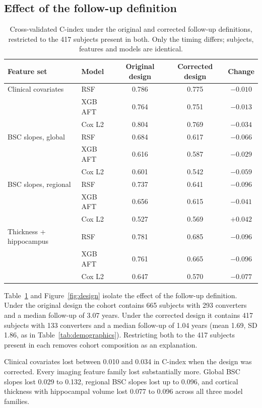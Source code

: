 \documentclass[blue]{ludusofficial}  %
\begin{document}
\subsection{Effect of the follow-up definition}

\begin{table}[t!]
\centering
\caption{Cross-validated C-index under the original and corrected follow-up definitions, restricted to the 417 subjects present in both. Only the timing differs; subjects, features and models are identical.}
\label{tab:design}
\begin{tabular}{llccc}
\hline
\textbf{Feature set} & \textbf{Model} & \textbf{Original design} & \textbf{Corrected design} & \textbf{Change} \\
\hline
Clinical covariates & RSF & 0.786 & 0.775 & $-0.010$ \\
 & XGB AFT & 0.764 & 0.751 & $-0.013$ \\
 & Cox L2 & 0.804 & 0.769 & $-0.034$ \\
\hline
BSC slopes, global & RSF & 0.684 & 0.617 & $-0.066$ \\
 & XGB AFT & 0.616 & 0.587 & $-0.029$ \\
 & Cox L2 & 0.601 & 0.542 & $-0.059$ \\
\hline
BSC slopes, regional & RSF & 0.737 & 0.641 & $-0.096$ \\
 & XGB AFT & 0.656 & 0.615 & $-0.041$ \\
 & Cox L2 & 0.527 & 0.569 & $+0.042$ \\
\hline
Thickness + hippocampus & RSF & 0.781 & 0.685 & $-0.096$ \\
 & XGB AFT & 0.761 & 0.665 & $-0.096$ \\
 & Cox L2 & 0.647 & 0.570 & $-0.077$ \\
\hline
\end{tabular}
\end{table}

Table~\ref{tab:design} and Figure~\ref{fig:design} isolate the effect of the follow-up definition. Under the original design the cohort contains 665 subjects with 293 converters and a median follow-up of 3.07 years. Under the corrected design it contains 417 subjects with 133 converters and a median follow-up of 1.04 years (mean 1.69, SD 1.86, as in Table~\ref{tab:demographics}). Restricting both to the 417 subjects present in each removes cohort composition as an explanation.

Clinical covariates lost between 0.010 and 0.034 in C-index when the design was corrected. Every imaging feature family lost substantially more. Global BSC slopes lost 0.029 to 0.132, regional BSC slopes lost up to 0.096, and cortical thickness with hippocampal volume lost 0.077 to 0.096 across all three model families.
\end{document}
